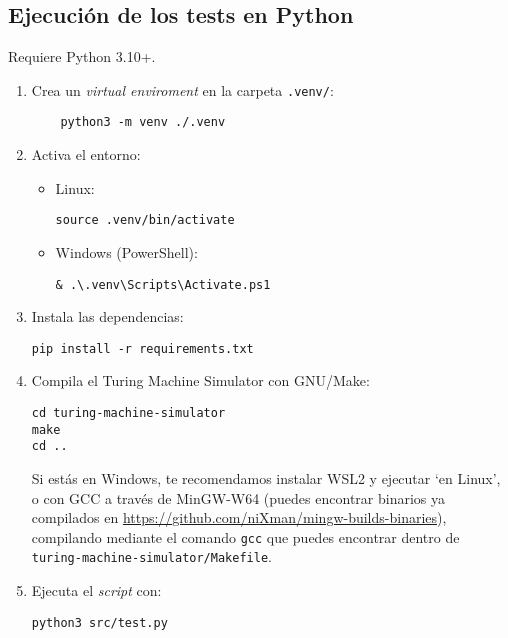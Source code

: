 \subsection*{Ejecución de los tests en Python}
Requiere Python 3.10+.
\begin{enumerate}
  \item Crea un \textit{virtual enviroment} en la carpeta \texttt{.venv/}:
  \begin{verbatim}
    python3 -m venv ./.venv
  \end{verbatim}
  \item Activa el entorno:
  \begin{itemize}
    \item Linux:
    \begin{verbatim}
source .venv/bin/activate
    \end{verbatim}
    \item Windows (PowerShell):
    \begin{verbatim}
& .\.venv\Scripts\Activate.ps1
    \end{verbatim}
  \end{itemize}
  \item Instala las dependencias:
  \begin{verbatim}
pip install -r requirements.txt
  \end{verbatim}
  \item Compila el Turing Machine Simulator\supercite{tmsimulator} con GNU/Make:
  \begin{verbatim}
cd turing-machine-simulator
make
cd ..
  \end{verbatim}
  Si estás en Windows, te recomendamos instalar WSL2 y ejecutar `en Linux', o con GCC a través de MinGW-W64 (puedes encontrar binarios ya compilados en \url{https://github.com/niXman/mingw-builds-binaries}), compilando mediante el comando \texttt{gcc} que puedes encontrar dentro de \texttt{turing-machine-simulator/\allowbreak Makefile}.
  \item Ejecuta el \textit{script} con:
  \begin{verbatim}
python3 src/test.py
  \end{verbatim}
\end{enumerate}
